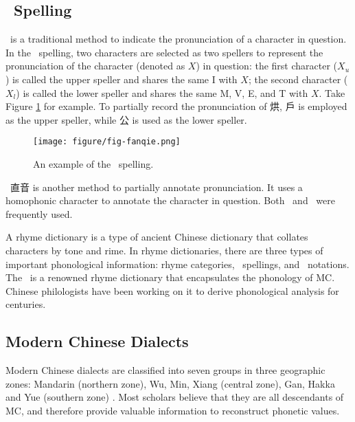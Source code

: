 \subsection{\fq~Spelling}
\fq~is a traditional method to indicate the pronunciation of a character in question. 
In the \fq~spelling, two characters are selected as two spellers to represent the pronunciation of the character (denoted as $X$) in question: 
the first character ($X_u$) is called the upper speller and shares the same I with $X$; 
the second character ($X_l$) is called the lower speller and shares the same M, V, E, and T with $X$. 
Take Figure \ref{fig:exp-fanqie} for example. 
To partially record the pronunciation of 烘, 戶 is employed as the upper speller, while 公 is used as the lower speller.
\begin{figure}[hbtp]
    \centering
    \texttt{[image: figure/fig-fanqie.png]}
    \caption{An example of the \fq~spelling. }
    \label{fig:exp-fanqie}
\end{figure}

\zhiyin~直音 is another method to partially annotate pronunciation. 
It uses a homophonic character to annotate the character in question. 
Both \fq~and \zhiyin~were frequently used. 

A rhyme dictionary is a type of ancient Chinese dictionary that collates characters by tone and rime. 
In rhyme dictionaries, there are three types of important phonological information: rhyme categories, \fq~spellings, and \zhiyin~notations. 
The \qy~is a renowned rhyme dictionary that encapsulates the phonology of MC. 
Chinese philologists have been working on it to derive phonological analysis for centuries.


\subsection{Modern Chinese Dialects} %
\label{intro-dialect}
Modern Chinese dialects are classified into seven groups in three geographic zones: 
Mandarin (northern zone), Wu, Min, Xiang (central zone), Gan, Hakka and Yue (southern zone) \citep{norman1988,dialectology}.
Most scholars believe that they are all descendants of MC, 
and therefore provide valuable information to reconstruct phonetic values. 

\begin{comment}
    
\end{comment}

